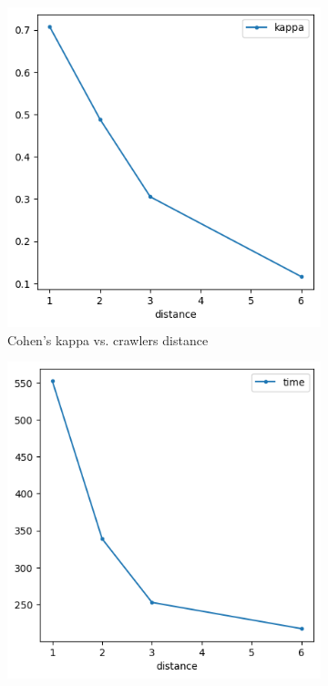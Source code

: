 \documentclass[francais,RandD]{rapportPFE}
\begin{document}
		\begin{figure}[h!]
			\begin{subfigure}[t]{0.49\linewidth}
				\includegraphics[width=\linewidth]{graphics/peinture_au_rouleau-kappa_vs_distance.png}
				\caption{Cohen's kappa vs. crawlers distance}
				\label{fig:peinture_au_rouleau-kappa_vs_distance}
			\end{subfigure}
			\hfill
			\begin{subfigure}[t]{0.49\linewidth}
					\includegraphics[width=\linewidth]{graphics/peinture_au_rouleau-time_vs_distance.png}

\end{subfigure}
\end{figure}
\end{document}
